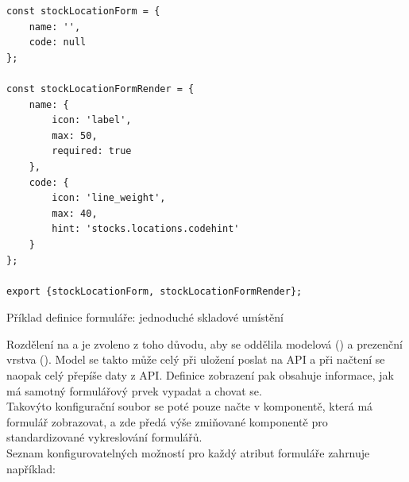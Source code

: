 \begin{listing}[h]
\begin{verbatim}
const stockLocationForm = {
    name: '',
    code: null
};

const stockLocationFormRender = {
    name: {
        icon: 'label',
        max: 50,
        required: true
    },
    code: {
        icon: 'line_weight',
        max: 40,
        hint: 'stocks.locations.codehint'
    }
};

export {stockLocationForm, stockLocationFormRender};
\end{verbatim}
\caption{Příklad definice formuláře: jednoduché skladové umístění} \label{code:formfields:def}
\end{listing}

Rozdělení na  a  je zvoleno z toho důvodu, aby se oddělila modelová () a prezenční vrstva (). Model se takto může celý při uložení poslat na API a při načtení se naopak celý přepíše daty z API. Definice zobrazení pak obsahuje informace, jak má samotný formulářový prvek vypadat a chovat se.\\
Takovýto konfigurační soubor se poté pouze načte v komponentě, která má formulář zobrazovat, a zde předá výše zmiňované komponentě pro standardizované vykreslování formulářů.\\
Seznam konfigurovatelných možností pro každý atribut formuláře zahrnuje například:

